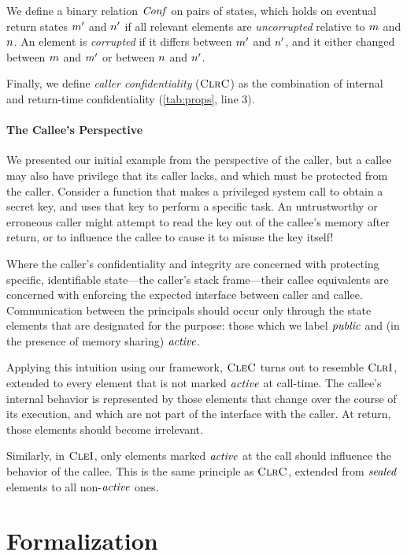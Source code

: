 \documentclass[10pt,conference]{ieeetran}%
\theoremstyle{definition}
\begin{document}
We define a binary relation \(\mathit{Conf}\) on pairs of states,
which holds on eventual return states \(m'\) and \(n'\)
if all relevant elements are {\em uncorrupted} relative to \(m\) and \(n\).
An element is {\em corrupted} if it differs between \(m'\) and \(n'\),
and it either changed between \(m\) and \(m'\) or between \(n\) and \(n'\).

Finally, we define \emph{caller confidentiality} (\(\textnormal{\sc ClrC}\)) as the
combination of internal and return-time confidentiality (\cref{tab:props}, line 3).

\paragraph*{The Callee's Perspective}

We presented our initial example from the perspective of the caller, but a callee
may also have privilege that its caller lacks, and which must be protected from the
caller. Consider a function that makes a privileged system call to obtain a secret key,
and uses that key to perform a specific task. An untrustworthy or erroneous caller might
attempt to read the key out of the callee's memory after return, or to influence the callee
to cause it to misuse the key itself!

Where the caller's confidentiality and integrity are concerned with protecting specific,
identifiable state---the caller's stack frame---their callee equivalents are concerned
with enforcing the expected interface between caller and callee. Communication between
the principals should occur only through the state elements that are designated for the
purpose: those which we label \(\mathit{public}\) and (in the presence of memory sharing) \(\mathit{active}\).

Applying this intuition using our framework, \(\textnormal{\sc CleC}\) turns out to resemble
\(\textnormal{\sc ClrI}\), extended to every element that is not marked \(\mathit{active}\) at call-time. The callee's
internal behavior is represented by those elements that change over the course of its
execution, and which are not part of the interface with the caller. At return, those
elements should become irrelevant.

Similarly, in \(\textnormal{\sc CleI}\), only elements marked \(\mathit{active}\) at the call should influence the
behavior of the callee. This is the same principle as \(\textnormal{\sc ClrC}\), extended from \(\mathit{sealed}\)
elements to all non-\(\mathit{active}\) ones.

\section{Formalization}
\label{sec:machine}
\end{document}
